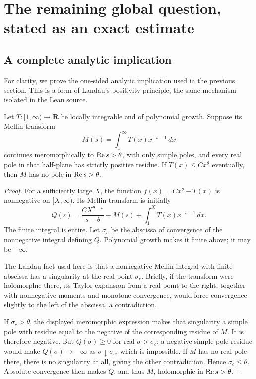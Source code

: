 \section{The remaining global question, stated as an exact estimate}
\label{sec:targets}

\subsection{A complete analytic implication}
For clarity, we prove the one-sided analytic implication used in the previous section. This is a form of Landau's positivity principle, the same mechanism isolated in the Lean source.

\begin{lemma}
\label{lem:mellin}
Let \(T:[1,\infty)\to\mathbf R\) be locally integrable and of polynomial growth. Suppose its Mellin transform
\[
 M(s)=\int_1^\infty T(x)x^{-s-1}\,dx
\]
continues meromorphically to \(\operatorname{Re} s>\theta\), with only simple poles, and every real pole in that half-plane has strictly positive residue. If
\(T(x)\le Cx^\theta\) eventually, then \(M\) has no pole in \(\operatorname{Re} s>\theta\).
\end{lemma}

\begin{proof}
For a sufficiently large \(X\), the function \(f(x)=Cx^\theta-T(x)\) is nonnegative on \([X,\infty)\). Its Mellin transform is initially
\[
 Q(s)=\frac{CX^{\theta-s}}{s-\theta}
       -M(s)+\int_1^X T(x)x^{-s-1}\,dx.
\]
The finite integral is entire. Let \(\sigma_c\) be the abscissa of convergence of the nonnegative integral defining \(Q\). Polynomial growth makes it finite above; it may be \(-\infty\).

The Landau fact used here is that a nonnegative Mellin integral with finite abscissa has a singularity at the real point \(\sigma_c\). Briefly, if the transform were holomorphic there, its Taylor expansion from a real point to the right, together with nonnegative moments and monotone convergence, would force convergence slightly to the left of the abscissa, a contradiction.

If \(\sigma_c>\theta\), the displayed meromorphic expression makes that singularity a simple pole with residue equal to the negative of the corresponding residue of \(M\). It is therefore negative. But \(Q(\sigma)\ge0\) for real \(\sigma>\sigma_c\); a negative simple-pole residue would make \(Q(\sigma)\to-\infty\) as \(\sigma\downarrow\sigma_c\), which is impossible. If \(M\) has no real pole there, there is no singularity at all, giving the other contradiction. Hence \(\sigma_c\le\theta\). Absolute convergence then makes \(Q\), and thus \(M\), holomorphic in \(\operatorname{Re} s>\theta\).
\end{proof}

